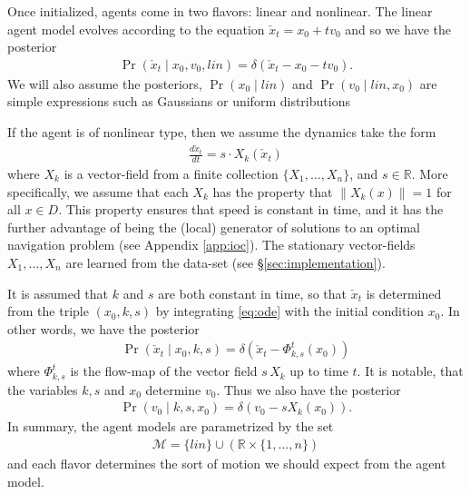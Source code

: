 \documentclass[conference]{IEEEtran}
\begin{document}
Once initialized, agents come in two flavors: linear and nonlinear.
The linear agent model evolves according to the equation $\check{x}_t = x_0 + t v_0$ and so we have the posterior
\begin{align*}
	\Pr( \check{x}_t \mid x_0, v_0, lin) = \delta( \check{x}_t - x_0 - t v_0 ).
\end{align*}
We will also assume the posteriors, $\Pr(x_0 \mid lin)$ and $\Pr( v_0 \mid lin, x_0)$ are simple expressions such as Gaussians or uniform distributions

If the agent is of nonlinear type, then we assume the dynamics take the form
\begin{align}
	\frac{d \check{x}_t}{dt} = s \cdot X_k(\check{x}_t) \label{eq:ode}
\end{align}
where $X_k$ is a vector-field from a finite collection $\{X_1, \dots, X_n\}$, and $s \in \mathbb{R}$.
More specifically, we assume that each $X_k$ has the property that $\| X_k(x) \| = 1$ for all $x \in D$.
This property ensures that speed is constant in time, and it has the further advantage of being the (local) generator
of solutions to an optimal navigation problem (see Appendix \ref{app:ioc}).
The stationary vector-fields $X_1,\dots,X_n$ are learned from the data-set (see \S \ref{sec:implementation}).

It is assumed that $k$ and $s$ are both constant in time, so that $\check{x}_t$ is determined from the
triple $(x_0,k,s)$ by integrating \eqref{eq:ode} with the initial condition $x_0$.
In other words, we have the posterior
\begin{align}
	\Pr( \check{x}_t \mid x_0 , k , s) = \delta( \check{x}_t - \Phi^{t}_{k,s}( x_0) ) \label{eq:x_check | ksx}
\end{align}
where $\Phi^{t}_{k,s}$ is the flow-map of the vector field $s \,X_k$ up to time $t$.
It is notable, that the variables $k,s$ and $x_0$ determine $v_0$.
Thus we also have the posterior
\begin{align}
	\Pr( v_0 \mid k, s, x_0) = \delta( v_0 -s X_k( x_0) ). \label{eq:v | ksx}
\end{align}
In summary, the agent models are parametrized by the set
\begin{align}
	\mathcal{M} = \{ lin \} \cup \left( \mathbb{R} \times \{ 1 , \dots, n \} \right) \label{eq:models}
\end{align}
and each flavor determines the sort of motion we should expect from the agent model.
\end{document}
